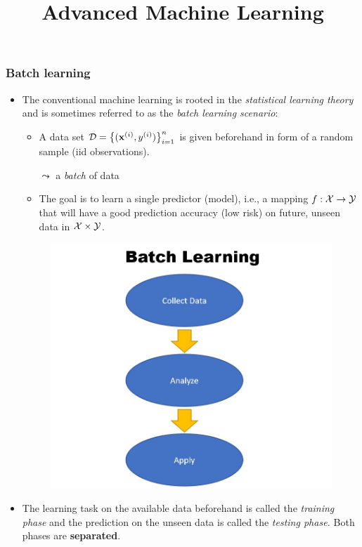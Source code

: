 \documentclass[11pt,compress,t,notes=noshow, xcolor=table]{beamer}
\title{Advanced Machine Learning}
\date{}
\begin{document}



\sloppy

\begin{frame} [t]
	\frametitle{Batch learning}
	\small
	\begin{itemize} 
			  \item The conventional machine learning is rooted in the \emph{statistical learning theory} and is sometimes referred to as the \emph{batch learning scenario}:	
			  \lz
			  
%			
			\begin{minipage}{.6\textwidth}
			\begin{itemize}\small
%				
				  \item A data set $\mathcal{D} = \big\{(\mathbf{x}^{(i)},y^{(i)})\big\}_{i=1}^n $   is given beforehand in form of a random sample (iid observations).
%				  
				  \item [$\leadsto$] a \emph{batch} of data
%				  
				  \item The goal is to learn a single predictor (model), i.e., a mapping $f:\mathcal{X} \to \mathcal{Y}$ that will have a good prediction accuracy (low risk) on future, unseen data in $\mathcal{X} \times \mathcal{Y}$. 
%				  
			\end{itemize}
		\end{minipage}
		\begin{minipage}{.3\textwidth}
			\begin{figure}
				\centering
				\includegraphics[width=0.99\linewidth]{figure/batch_learning}
			\end{figure}
		\end{minipage}
		\lz
		  \item The learning task on the available data beforehand is called the \emph{training phase} and the prediction on the unseen data is called the \emph{testing phase.} Both phases are \textbf{separated}.
	\end{itemize}
\end{frame}
\end{document}
